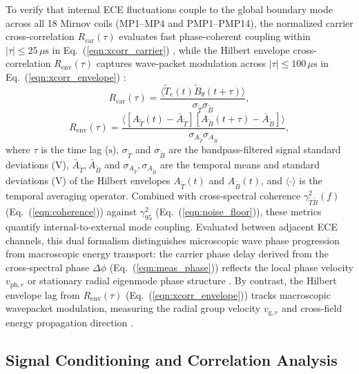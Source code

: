 To verify that internal ECE fluctuations couple to the global boundary mode across all 18 Mirnov coils (MP1--MP4 and PMP1--PMP14), the normalized carrier cross-correlation $R_{\mathrm{car}}(\tau)$ evaluates fast phase-coherent coupling within $|\tau| \le 25\,\mu\mathrm{s}$ in Eq.~(\ref{eqn:xcorr_carrier}) \cite{Smith1971, bendat2010random}, while the Hilbert envelope cross-correlation $R_{\mathrm{env}}(\tau)$ captures wave-packet modulation across $|\tau| \le 100\,\mu\mathrm{s}$ in Eq.~(\ref{eqn:xcorr_envelope}) \cite{Fabus2021, boashash2015time}:
\begin{equation}
\label{eqn:xcorr_carrier}
R_{\mathrm{car}}(\tau) = \frac{\langle \tilde{T}_e(t) \tilde{B}_\theta(t+\tau) \rangle}{\sigma_{\tilde{T}} \sigma_{\tilde{B}}},
\end{equation}
\begin{equation}
\label{eqn:xcorr_envelope}
R_{\mathrm{env}}(\tau) = \frac{\langle [A_{\tilde{T}}(t) - \bar{A}_{\tilde{T}}] [A_{\tilde{B}}(t+\tau) - \bar{A}_{\tilde{B}}] \rangle}{\sigma_{A_{\tilde{T}}} \sigma_{A_{\tilde{B}}}},
\end{equation}
\noindent where $\tau$ is the time lag ($\mathrm{s}$), $\sigma_{\tilde{T}}$ and $\sigma_{\tilde{B}}$ are the bandpass-filtered signal standard deviations ($\mathrm{V}$), $\bar{A}_{\tilde{T}}, \bar{A}_{\tilde{B}}$ and $\sigma_{A_{\tilde{T}}}, \sigma_{A_{\tilde{B}}}$ are the temporal means and standard deviations ($\mathrm{V}$) of the Hilbert envelopes $A_{\tilde{T}}(t)$ and $A_{\tilde{B}}(t)$, and $\langle \cdot \rangle$ is the temporal averaging operator. Combined with cross-spectral coherence $\gamma_{\tilde{T}\tilde{B}}^2(f)$ (Eq.~(\ref{eqn:coherence})) against $\gamma_{95}^2$ (Eq.~(\ref{eqn:noise_floor})), these metrics quantify internal-to-external mode coupling. Evaluated between adjacent ECE channels, this dual formalism distinguishes microscopic wave phase progression from macroscopic energy transport: the carrier phase delay derived from the cross-spectral phase $\Delta\phi$ (Eq.~(\ref{eqn:meas_phase})) reflects the local phase velocity $v_{\mathrm{ph},r}$ or stationary radial eigenmode phase structure \cite{Smith1971, Weir2019}. By contrast, the Hilbert envelope lag from $R_{\mathrm{env}}(\tau)$ (Eq.~(\ref{eqn:xcorr_envelope})) tracks macroscopic wavepacket modulation, measuring the radial group velocity $v_{\mathrm{g},r}$ and cross-field energy propagation direction \cite{Fabus2021, boashash2015time}.

\subsection{Signal Conditioning and Correlation Analysis}

